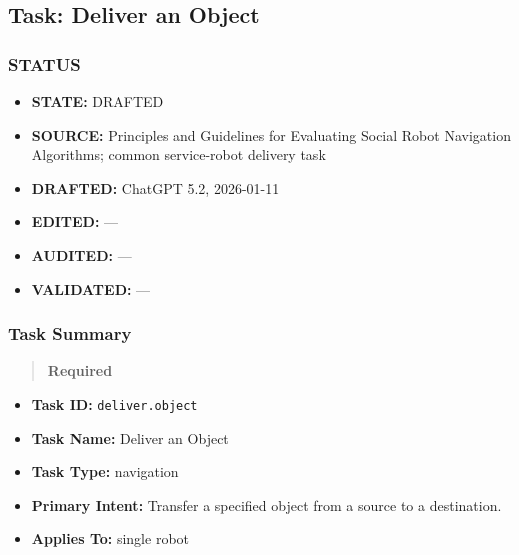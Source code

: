 \documentclass[utf8]{frontiers_suppmat} %
\providecommand{\tightlist}{%
  \setlength{\itemsep}{0pt}\setlength{\parskip}{0pt}}
\begin{document}
\subsection{Task: Deliver an Object}\label{task-deliver-an-object}

\subsubsection{STATUS}\label{status}

\begin{itemize}
\tightlist
\item
  \textbf{STATE:} DRAFTED\\
\item
  \textbf{SOURCE:} Principles and Guidelines for Evaluating Social Robot
  Navigation Algorithms; common service-robot delivery task\\
\item
  \textbf{DRAFTED:} ChatGPT 5.2, 2026-01-11\\
\item
  \textbf{EDITED:} ---\\
\item
  \textbf{AUDITED:} ---\\
\item
  \textbf{VALIDATED:} ---
\end{itemize}

\subsubsection{Task Summary}\label{task-summary}

\begin{quote}
\textbf{Required}
\end{quote}

\begin{itemize}
\tightlist
\item
  \textbf{Task ID:} \texttt{deliver.object}\\
\item
  \textbf{Task Name:} Deliver an Object\\
\item
  \textbf{Task Type:} navigation\\
\item
  \textbf{Primary Intent:} Transfer a specified object from a source to
  a destination.\\
\item
  \textbf{Applies To:} single robot
\end{itemize}
\end{document}
